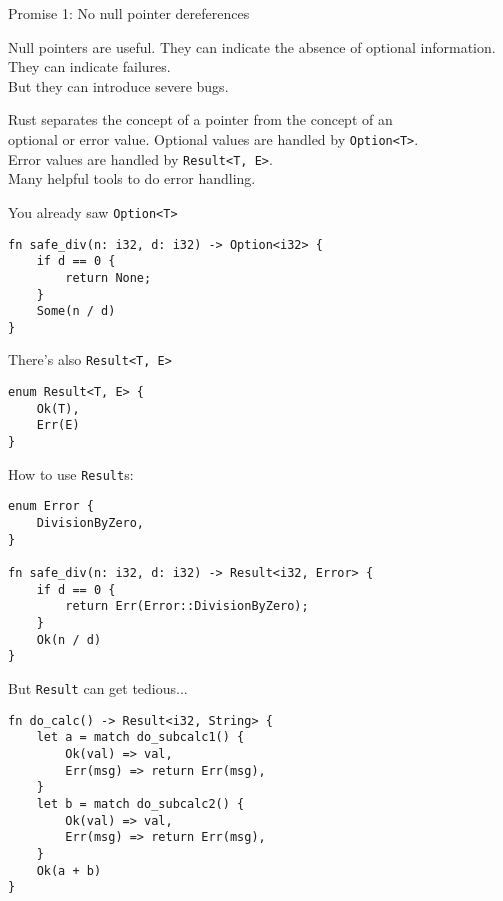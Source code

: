 \begin{frame}{Promise 1: No null pointer dereferences}

\begin{block}{Null pointers are useful.}
They can indicate the absence of optional information.\\
They can indicate failures.\\
\pause
But they can introduce severe bugs.
\end{block}
\vspace{1em}
\pause
\begin{block}{Rust separates the concept of a pointer from the concept of an\\
		optional or error value.}
	Optional values are handled by \texttt{Option<T>}.\\
  Error values are handled by \texttt{Result<T, E>}.\\
	Many helpful tools to do error handling.
\end{block}

\end{frame}


\begin{frame}[fragile]{You already saw \texttt{Option<T>}}
\begin{verbatim}
fn safe_div(n: i32, d: i32) -> Option<i32> {
    if d == 0 {
        return None;
    }
    Some(n / d)
}
\end{verbatim}
\end{frame}


\begin{frame}[fragile]{There's also \texttt{Result<T, E>}}
\begin{verbatim}
enum Result<T, E> {
    Ok(T),
    Err(E)
}
\end{verbatim}
\end{frame}


\begin{frame}[fragile]{How to use \texttt{Result}s:}
\begin{verbatim}
enum Error {
    DivisionByZero,
}

fn safe_div(n: i32, d: i32) -> Result<i32, Error> {
    if d == 0 {
        return Err(Error::DivisionByZero);
    }
    Ok(n / d)
}
\end{verbatim}
\end{frame}


\begin{frame}[fragile]{But \texttt{Result} can get tedious...}
\begin{verbatim}
fn do_calc() -> Result<i32, String> {
    let a = match do_subcalc1() {
        Ok(val) => val,
        Err(msg) => return Err(msg),
    }
    let b = match do_subcalc2() {
        Ok(val) => val,
        Err(msg) => return Err(msg),
    }
    Ok(a + b)
}
\end{verbatim}
\end{frame}

